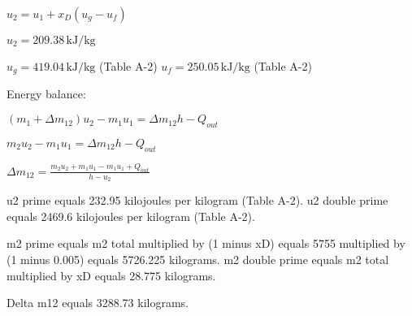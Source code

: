 \( u_2 = u_1 + x_D (u_g - u_f) \)  

\( u_2 = 209.38 \, \text{kJ/kg} \)  

\( u_g = 419.04 \, \text{kJ/kg} \) (Table A-2)  
\( u_f = 250.05 \, \text{kJ/kg} \) (Table A-2)  

Energy balance:  

\( (m_1 + \Delta m_{12}) u_2 - m_1 u_1 = \Delta m_{12} h - Q_{out} \)  

\( m_2 u_2 - m_1 u_1 = \Delta m_{12} h - Q_{out} \)  

\( \Delta m_{12} = \frac{m_2 u_2 + m_1 u_1 - m_1 u_1 + Q_{out}}{h - u_2} \)

u2 prime equals 232.95 kilojoules per kilogram (Table A-2).  
u2 double prime equals 2469.6 kilojoules per kilogram (Table A-2).  

m2 prime equals m2 total multiplied by (1 minus xD) equals 5755 multiplied by (1 minus 0.005) equals 5726.225 kilograms.  
m2 double prime equals m2 total multiplied by xD equals 28.775 kilograms.  

Delta m12 equals 3288.73 kilograms.